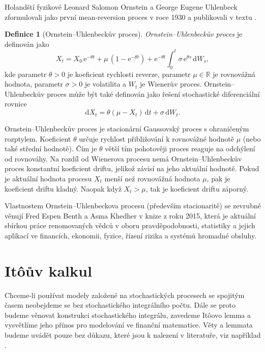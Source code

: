\documentclass[a4paper,12pt]{report}
\theoremstyle{definition} \newtheorem{definice}[veta]{Definice}
\theoremstyle{remark}
\begin{document}
Holandští fyzikové Leonard Salomon Ornstein a George Eugene Uhlenbeck zformulovali jako první mean-reversion proces v roce 1930 a publikovali v textu \cite{OrnsteinUhlenbeck1930}. 

\begin{definice}[Ornstein–Uhlenbeckův proces]
\textit{Ornstein–Uhlenbeckův proces} je definován jako
\begin{equation}\label{OUP}
X_t = X_0\,\mathrm{e}^{-\theta t} + \mu\,(1-\mathrm{e}^{-\theta t}) + \mathrm{e}^{-\theta t}\int_0^t \sigma\,\mathrm{e}^{\theta s}\,\mathrm{d}W_s,
\end{equation}
kde parametr $\theta>0$ je koeficient rychlosti reverze, parametr $\mu\in\mathbb{R}$ je rovnovážná hodnota, parametr $\sigma>0$ je volatilita a $W_t$ je Wienerův proces.
Ornstein–Uhlenbeckův proces může být také definován jako řešení stochastické diferenciální rovnice
\begin{equation}\label{SDE_OUP}
\mathrm{d}X_t = \theta(\mu-X_t)\,\mathrm{d}t + \sigma\,\mathrm{d}W_t.
\end{equation}
\end{definice}

Ornstein–Uhlenbeckův proces je stacionární Gaussovský proces s ohraničeným rozptylem. 
Koeficient $\theta$ určuje rychlost přibližování k rovnovážné hodnotě $\mu$ (nebo také střední hodnotě).
Čím je $\theta$ větší tím pohotověji proces reaguje na odchýlení od rovnováhy. 
Na rozdíl od Wienerova procesu nemá Ornstein–Uhlenbeckův proces konstantní koeficient driftu, jelikož závisí na jeho aktuální hodnotě.
Pokud je aktuální hodnota procesu $X_t$ menší než rovnovážná hodnota $\mu$, pak je koeficient driftu kladný.
Naopak když $X_t>\mu$, tak je koeficient driftu záporný.

Vlastnostem Ornstein–Uhlenbeckova procesu (především stacionaritě) se zevrubně věnují Fred Espen Benth a Asma Khedher v knize \cite{podolskij2015fascination} z roku 2015, která je aktuální sbírkou práce renomovaných vědců v oboru pravděpodobnosti, statistiky a jejich aplikací ve financích, ekonomii, fyzice, řízení rizika a systémů hromadné obsluhy.

\section{It\^oův kalkul}
Chceme-li používat modely založené na stochastických procesech se spojitým časem neobejdeme se bez stochastického integrálního počtu.
Dále se proto budeme věnovat konstrukci stochastického integrálu, zavedeme It\^oovo lemma a vysvětlíme jeho přínos pro modelování ve finanční matematice.
Věty a lemmata budeme uvádět pouze bez důkazu, které jsou k nalezení v literatuře, viz například \cite{karatzas2012brownian}.
\end{document}
